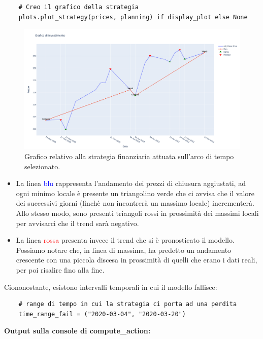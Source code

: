 \documentclass{article}
\begin{document}
\begin{verbatim}
    # Creo il grafico della strategia
    plots.plot_strategy(prices, planning) if display_plot else None 
\end{verbatim}
\label{}
\begin{figure}[H]
    \centering
    \includegraphics[width=0.90\linewidth]{strategyPlot.png}
    \caption{\label{fig:strategyPlot} Grafico relativo alla strategia finanziaria attuata sull'arco di tempo selezionato.}
\end{figure}
\begin{itemize}
    \item La linea \textcolor{blue}{blu} rappresenta l'andamento dei prezzi di chiusura aggiustati, ad ogni minimo locale è presente un triangolino verde che ci avvisa che il valore dei successivi giorni (finchè non incontrerà un massimo locale) incrementerà. Allo stesso modo, sono presenti triangoli rossi in prossimità dei massimi locali per avvisarci che il trend sarà negativo.
    \item La linea \textcolor{red}{rossa} presenta invece il trend che si è pronosticato il modello. Possiamo notare che, in linea di massima, ha predetto un andamento crescente con una piccola discesa in prossimità di quelli che erano i dati reali, per poi risalire fino alla fine.
\end{itemize}
Ciononostante, esistono intervalli temporali in cui il modello fallisce:
\begin{verbatim}
    # range di tempo in cui la strategia ci porta ad una perdita
    time_range_fail = ("2020-03-04", "2020-03-20")
\end{verbatim}
\textbf{Output sulla console di compute\_action:}
\end{document}
